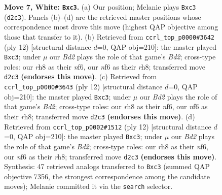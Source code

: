 \documentclass[11pt]{article}
\begin{document}
\begin{figure}[p]
\caption{\textbf{Move 7, White: \texttt{Bxc3}.} (a) Our position; Melanie plays \texttt{Bxc3} (\texttt{d2c3}). Panels (b)--(d) are the retrieved master positions whose correspondence most drove this move (highest QAP objective among those that transfer to it). (b) Retrieved from \texttt{ccrl\_top\_p0000\#3642} (ply 12) [structural distance $d$=0, QAP obj=210]: the master played \texttt{Bxc3}; under $\mu$ our \emph{Bd2} plays the role of that game's \emph{Bd2}; cross-type roles: our \emph{r}h8 as their \emph{n}f6, our \emph{n}f6 as their \emph{r}h8; transferred move \texttt{d2c3} \textbf{(endorses this move)}. (c) Retrieved from \texttt{ccrl\_top\_p0000\#3643} (ply 12) [structural distance $d$=0, QAP obj=210]: the master played \texttt{Bxc3}; under $\mu$ our \emph{Bd2} plays the role of that game's \emph{Bd2}; cross-type roles: our \emph{r}h8 as their \emph{n}f6, our \emph{n}f6 as their \emph{r}h8; transferred move \texttt{d2c3} \textbf{(endorses this move)}. (d) Retrieved from \texttt{ccrl\_top\_p0002\#1512} (ply 12) [structural distance $d$=0, QAP obj=210]: the master played \texttt{Bxc3}; under $\mu$ our \emph{Bd2} plays the role of that game's \emph{Bd2}; cross-type roles: our \emph{r}h8 as their \emph{n}f6, our \emph{n}f6 as their \emph{r}h8; transferred move \texttt{d2c3} \textbf{(endorses this move)}. Synthesis: 47 retrieved analogs transferred to \texttt{Bxc3} (summed QAP objective 7356, the strongest correspondence among the candidate moves); Melanie committed it via the \texttt{search} selector.}
\label{fig:thought-m12}
\end{figure}

\clearpage
\end{document}
